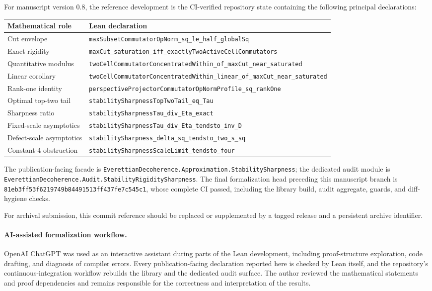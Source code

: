 \documentclass[11pt]{article}
\begin{document}
For manuscript version 0.8, the reference development is the CI-verified
repository state containing the following principal declarations:
\begin{center}
\begin{tabular}{p{}p{}}
\hline
Mathematical role & Lean declaration\\
\hline
Cut envelope &
\texttt{maxSubsetCommutatorOpNorm\_sq\_le\_half\_globalSq}\\
Exact rigidity &
\texttt{maxCut\_saturation\_iff\_exactlyTwoActiveCellCommutators}\\
Quantitative modulus &
\texttt{twoCellCommutatorConcentratedWithin\_of\_maxCut\_near\_saturated}\\
Linear corollary &
\texttt{twoCellCommutatorConcentratedWithin\_linear\_of\_maxCut\_near\_saturated}\\
Rank-one identity &
\texttt{perspectiveProjectorCommutatorOpNormProfile\_sq\_rankOne}\\
Optimal top-two tail &
\texttt{stabilitySharpnessTopTwoTail\_eq\_Tau}\\
Sharpness ratio &
\texttt{stabilitySharpnessTau\_div\_Eta\_exact}\\
Fixed-scale asymptotics &
\texttt{stabilitySharpnessTau\_div\_Eta\_tendsto\_inv\_D}\\
Defect-scale asymptotics &
\texttt{stabilitySharpness\_delta\_sq\_tendsto\_two\_s\_sq}\\
Constant-$4$ obstruction &
\texttt{stabilitySharpnessScaleLimit\_tendsto\_four}\\
\hline
\end{tabular}
\end{center}

The publication-facing facade is
\texttt{EverettianDecoherence.Approximation.StabilitySharpness}; the dedicated
audit module is
\texttt{EverettianDecoherence.Audit.StabilityRigiditySharpness}.
The final formalization head preceding this manuscript branch is
\texttt{81eb3ff53f6219749b84491513ff437fe7c545c1}, whose complete CI passed,
including the library build, audit aggregate, guards, and diff-hygiene checks.

For archival submission, this commit reference should be replaced or
supplemented by a tagged release and a persistent archive identifier.

\paragraph{AI-assisted formalization workflow.}
OpenAI ChatGPT was used as an interactive assistant during parts of the Lean
development, including proof-structure exploration, code drafting, and
diagnosis of compiler errors. Every publication-facing declaration reported
here is checked by Lean itself, and the repository's continuous-integration
workflow rebuilds the library and the dedicated audit surface. The author
reviewed the mathematical statements and proof dependencies and remains
responsible for the correctness and interpretation of the results.
\end{document}
